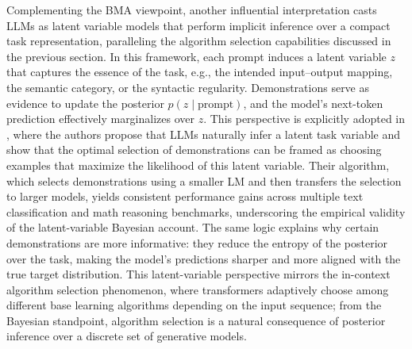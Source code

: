 \documentclass[11pt]{article}
\begin{document}
Complementing the BMA viewpoint, another influential interpretation casts LLMs as latent variable models that perform implicit inference over a compact task representation, paralleling the algorithm selection capabilities discussed in the previous section. In this framework, each prompt induces a latent variable \(z\) that captures the essence of the task, e.g., the intended input--output mapping, the semantic category, or the syntactic regularity. Demonstrations serve as evidence to update the posterior \(p(z \mid \text{prompt})\), and the model's next-token prediction effectively marginalizes over \(z\). This perspective is explicitly adopted in \cite{ref11}, where the authors propose that LLMs naturally infer a latent task variable and show that the optimal selection of demonstrations can be framed as choosing examples that maximize the likelihood of this latent variable. Their algorithm, which selects demonstrations using a smaller LM and then transfers the selection to larger models, yields consistent performance gains across multiple text classification and math reasoning benchmarks, underscoring the empirical validity of the latent-variable Bayesian account. The same logic explains why certain demonstrations are more informative: they reduce the entropy of the posterior over the task, making the model's predictions sharper and more aligned with the true target distribution. This latent-variable perspective mirrors the in-context algorithm selection phenomenon, where transformers adaptively choose among different base learning algorithms depending on the input sequence; from the Bayesian standpoint, algorithm selection is a natural consequence of posterior inference over a discrete set of generative models.
\end{document}
